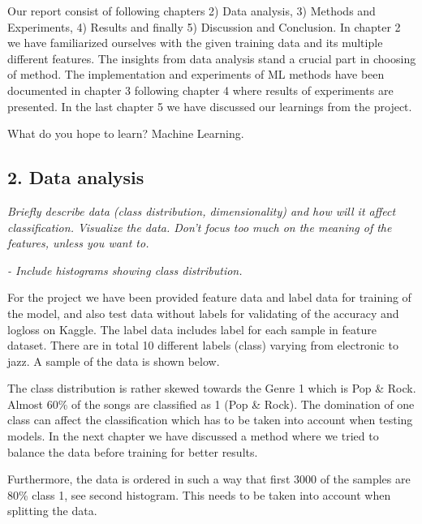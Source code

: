 \documentclass[11pt]{article}
\begin{document}
Our report consist of following chapters 2) Data analysis, 3) Methods
and Experiments, 4) Results and finally 5) Discussion and Conclusion. In
chapter 2 we have familiarized ourselves with the given training data
and its multiple different features. The insights from data analysis
stand a crucial part in choosing of method. The implementation and
experiments of ML methods have been documented in chapter 3 following
chapter 4 where results of experiments are presented. In the last
chapter 5 we have discussed our learnings from the project.

What do you hope to learn? Machine Learning.

    \hypertarget{data-analysis}{%
\subsection{2. Data analysis}\label{data-analysis}}

    \emph{Briefly describe data (class distribution, dimensionality) and how
will it affect classification. Visualize the data. Don't focus too much
on the meaning of the features, unless you want to.}

\emph{- Include histograms showing class distribution.}

For the project we have been provided feature data and label data for
training of the model, and also test data without labels for validating
of the accuracy and logloss on Kaggle. The label data includes label for
each sample in feature dataset. There are in total 10 different labels
(class) varying from electronic to jazz. A sample of the data is shown
below.

The class distribution is rather skewed towards the Genre 1 which is Pop
\& Rock. Almost 60\% of the songs are classified as 1 (Pop \& Rock). The
domination of one class can affect the classification which has to be
taken into account when testing models. In the next chapter we have
discussed a method where we tried to balance the data before training
for better results.

Furthermore, the data is ordered in such a way that first 3000 of the
samples are 80\% class 1, see second histogram. This needs to be taken
into account when splitting the data.
\end{document}

